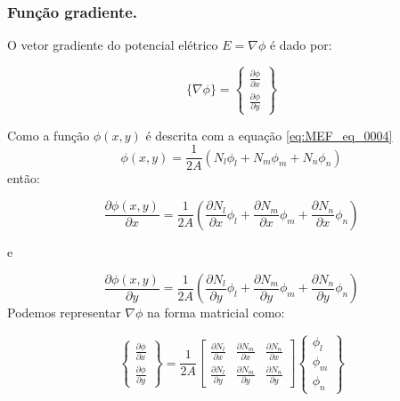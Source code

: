 \documentclass[
12pt,
a4paper,
oneside,
chapter=TITLE,
sumario=tradicional
]{abntex2}
\begin{document}
    \subsubsection*{Função gradiente.}
    
    
    O vetor gradiente do potencial elétrico $E=\nabla\phi$ é dado por:
    
    \begin{equation} %
    	\{\nabla\phi\} = 
    	\begin{Bmatrix} \frac{\partial \phi}{\partial x}\\\frac{\partial \phi}{\partial y}\end{Bmatrix}
    	\label{eq:gradiente_phi}
    \end{equation}
    
    Como a função  $\phi(x,y)$ é descrita com a equação \ref{eq:MEF_eq_0004}
   	\begin{equation*} %
   		\phi(x,y) = \frac{1}{2A} (N_l\phi_l +N_m\phi_m +N_n\phi_n)
   	\end{equation*}
    então:
    
    \begin{equation}
    	\frac{\partial \phi(x,y)}{\partial x} = \frac{1}{2A}
    	\left ( \frac{\partial N_l}{\partial x}\phi_l +
    	\frac{\partial N_m}{\partial x}\phi_m +
    	\frac{\partial N_n}{\partial x}\phi_n \right )
    	\label{eq:parcial_x}
    \end{equation}
    
    e
    
    \begin{equation}
    	\frac{\partial \phi(x,y)}{\partial y} = \frac{1}{2A}
    	\left ( \frac{\partial N_l}{\partial y}\phi_l +
    	\frac{\partial N_m}{\partial y}\phi_m +
    	\frac{\partial N_n}{\partial y}\phi_n \right )
    	\label{eq:parcial_y}
    \end{equation}
     Podemos representar  $\nabla\phi$ na forma matricial como:
     
\begin{equation}
	\begin{Bmatrix} \frac{\partial \phi}{\partial x}\\\frac{\partial \phi}{\partial y}\end{Bmatrix} =
	\frac{1}{2A} 
	\begin{bmatrix} \frac{\partial N_l}{\partial x}& \frac{\partial N_m}{\partial x}& \frac{\partial N_n}{\partial x}\\ 
		\frac{\partial N_l}{\partial y}& \frac{\partial N_m}{\partial y}& \frac{\partial N_n}{\partial y} \end{bmatrix}
	\begin{Bmatrix} \phi_l\\ \phi_m\\ \phi_n\end{Bmatrix}
	\label{eq:parcial_total}
\end{equation}
     
\end{document}
